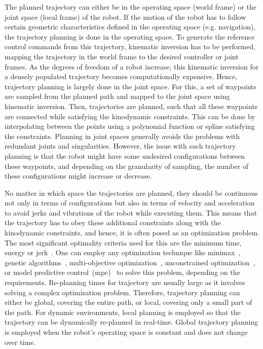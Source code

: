 The planned trajectory can either be in the operating space (world frame) or the joint space (local frame) of the robot. If the motion of the robot has to follow certain geometric characteristics defined in the operating space (e.g. navigation), the trajectory planning is done in the operating space. To generate the reference control commands from this trajectory, kinematic inversion has to be performed, mapping the trajectory in the world frame to the desired controller or joint frames. As the degrees of freedom of a robot increase, this kinematic inversion for a densely populated trajectory becomes computationally expensive. Hence, trajectory planning is largely done in the joint space. For this, a set of waypoints are sampled from the planned path and mapped to the joint space using kinematic inversion. Then, trajectories are planned, such that all these waypoints are connected while satisfying the kinodynamic constraints. This can be done by interpolating between the points using a polynomial function or spline satisfying the constraints. Planning in joint spaces generally avoids the problems with redundant joints and singularities. However, the issue with such trajectory planning is that the robot might have some undesired configurations between these waypoints, and depending on the granularity of sampling, the number of these configurations might increase or decrease. 

No matter in which space the trajectories are planned, they should be continuous not only in terms of configurations but also in terms of velocity and acceleration to avoid jerks and vibrations of the robot while executing them. This means that the trajectory has to obey these additional constraints along with the kinodynamic constraints, and hence, it is often posed as an optimization problem. The most significant optimality criteria used for this are the minimum time, energy or jerk~\cite{gasparetto2015path}. One can employ any optimization technique like minimax~\cite{vathsal1977minimax}, genetic algorithms~\cite{tian2004effective}, multi-objective optimization~\cite{oleiwi2014multi}, unconstrained optimization~\cite{rosmann2013efficient}, or model predictive control~(\acrshort{mpc})~\cite{ardakani2015real} to solve this problem, depending on the requirements. Re-planning times for trajectory are usually large as it involves solving a complex optimization problem. Therefore, trajectory planning can either be global, covering the entire path, or local, covering only a small part of the path. For dynamic environments, local planning is employed so that the trajectory can be dynamically re-planned in real-time. Global trajectory planning is employed when the robot's operating space is constant and does not change over time. 

